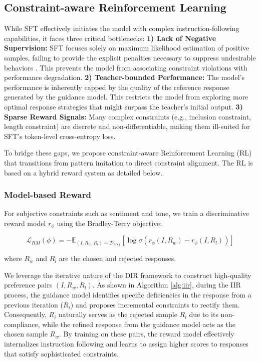 \subsection{Constraint-aware Reinforcement Learning}
\label{sec:rl}

While SFT effectively initiates the model with complex instruction-following capabilities, it faces three critical bottlenecks: \textbf{1) Lack of Negative Supervision:} SFT focuses solely on maximum likelihood estimation of positive samples, failing to provide the explicit penalties necessary to suppress undesirable behaviors \citep{gudibande2023falsepromiseimitatingproprietary}. This prevents the model from associating constraint violations with performance degradation. \textbf{2) Teacher-bounded Performance:} The model's performance is inherently capped by the quality of the reference response generated by the guidance model. This restricts the model from exploring more optimal response strategies that might surpass the teacher's initial output. \textbf{3) Sparse Reward Signals:} Many complex constraints (e.g., inclusion constraint, length constraint) are discrete and non-differentiable, making them ill-suited for SFT’s token-level cross-entropy loss.

To bridge these gaps, we propose constraint-aware Reinforcement Learning (RL) that transitions from pattern imitation to direct constraint alignment. The RL is based on a hybrid reward system as detailed below.

\subsubsection{Model-based Reward}

For subjective constraints such as sentiment and tone, we train a discriminative reward model $r_\phi$ using the Bradley-Terry objective:

\begin{equation}
\mathcal{L}_{RM}(\phi) = -\mathbb{E}_{(I, R_w, R_l) \sim \mathcal{D}_{pref}} \left[ \log \sigma \left( r_\phi(I, R_w) - r_\phi(I, R_l) \right) \right]
\end{equation}

\noindent where $R_w$ and $R_l$ are the chosen and rejected responses.

We leverage the iterative nature of the DIR framework to construct high-quality preference pairs $(I, R_w, R_l)$. As shown in Algorithm \ref{alg:iir}, during the IIR process, the guidance model identifies specific deficiencies in the response from a previous iteration ($R_i$) and proposes incremental constraints to rectify them. Consequently, $R_i$ naturally serves as the rejected sample $R_l$ due to its non-compliance, while the refined response from the guidance model acts as the chosen sample $R_w$. By training on these pairs, the reward model effectively internalizes instruction following and learns to assign higher scores to responses that satisfy sophisticated constraints.

